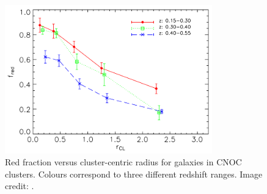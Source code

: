 \begin{figure}
  \centering
  \includegraphics[width=0.8\textwidth]{redFrac_r_li.png}
  \caption[Red fraction versus cluster-centric radius]{Red fraction
    versus cluster-centric radius for galaxies in 
    CNOC clusters.  Colours correspond to three different redshift
    ranges. Image credit: \citet{li2009}.}
  \label{fig:redFrac_r_li}
\end{figure}

